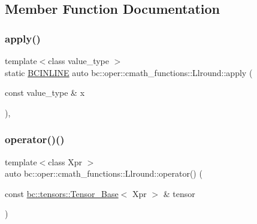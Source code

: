 \subsection{Member Function Documentation}
\mbox{\label{structbc_1_1oper_1_1cmath__functions_1_1Llround_a24418651286cf92222fe4d08edf78b0b}} 
\subsubsection{\texorpdfstring{apply()}{apply()}}
{\footnotesize\ttfamily template$<$class value\+\_\+type $>$ \\
static \hyperlink{common_8h_a6699e8b0449da5c0fafb878e59c1d4b1}{B\+C\+I\+N\+L\+I\+NE} auto bc\+::oper\+::cmath\+\_\+functions\+::\+Llround\+::apply (\begin{DoxyParamCaption}\item[{const value\+\_\+type \&}]{x }\end{DoxyParamCaption})\hspace{0.3cm}{\ttfamily [inline]}, {\ttfamily [static]}}

\mbox{\label{structbc_1_1oper_1_1cmath__functions_1_1Llround_a0b6262d9da5c0c9ef39fec5df46326ec}} 
\subsubsection{\texorpdfstring{operator()()}{operator()()}\hspace{0.1cm}{\footnotesize\ttfamily [1/3]}}
{\footnotesize\ttfamily template$<$class Xpr $>$ \\
auto bc\+::oper\+::cmath\+\_\+functions\+::\+Llround\+::operator() (\begin{DoxyParamCaption}\item[{const \hyperlink{classbc_1_1tensors_1_1Tensor__Base}{bc\+::tensors\+::\+Tensor\+\_\+\+Base}$<$ Xpr $>$ \&}]{tensor }\end{DoxyParamCaption})\hspace{0.3cm}{\ttfamily [inline]}}

